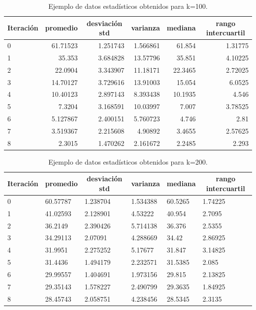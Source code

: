 \documentclass{article}
\begin{document}
\begin{table}[h!]
\centering
\caption{Ejemplo de datos estadísticos obtenidos para k=100.}
\label{tabla2}
\begin{tabular}{|l|r|r|r|r|r|}
\hline
\multicolumn{1}{|c|}{\textbf{Iteración}} & \multicolumn{1}{c|}{\textbf{promedio}} & \multicolumn{1}{c|}{\textbf{desviación std}} & \multicolumn{1}{c|}{\textbf{varianza}} & \multicolumn{1}{c|}{\textbf{mediana}} & \multicolumn{1}{c|}{\textbf{rango intercuartil}} \\ \hline
0 & 61.71523 & 1.251743 & 1.566861 & 61.854 & 1.31775 \\ \hline
1 & 35.353 & 3.684828 & 13.57796 & 35.851 & 4.10225 \\ \hline
2 & 22.0904 & 3.343907 & 11.18171 & 22.3465 & 2.72025 \\ \hline
3 & 14.70127 & 3.729616 & 13.91003 & 15.054 & 6.0525 \\ \hline
4 & 10.40123 & 2.897143 & 8.393438 & 10.1935 & 4.546 \\ \hline
5 & 7.3204 & 3.168591 & 10.03997 & 7.007 & 3.78525 \\ \hline
6 & 5.127867 & 2.400151 & 5.760723 & 4.746 & 2.81 \\ \hline
7 & 3.519367 & 2.215608 & 4.90892 & 3.4655 & 2.57625 \\ \hline
8 & 2.3015 & 1.470262 & 2.161672 & 2.2485 & 2.293 \\ \hline
\end{tabular}
\end{table}

\begin{table}[h!]
\centering
\caption{Ejemplo de datos estadísticos obtenidos para k=200.}
\label{tabla3}
\begin{tabular}{|l|l|l|l|l|l|}
\hline
\multicolumn{1}{|c|}{\textbf{Iteración}} & \multicolumn{1}{c|}{\textbf{promedio}} & \multicolumn{1}{c|}{\textbf{desviación std}} & \multicolumn{1}{c|}{\textbf{varianza}} & \multicolumn{1}{c|}{\textbf{mediana}} & \multicolumn{1}{c|}{\textbf{rango intercuartil}} \\ \hline
0 & 60.57787 & 1.238704 & 1.534388 & 60.5265 & 1.74225 \\ \hline
1 & 41.02593 & 2.128901 & 4.53222 & 40.954 & 2.7095 \\ \hline
2 & 36.2149 & 2.390426 & 5.714138 & 36.376 & 2.5355 \\ \hline
3 & 34.29113 & 2.07091 & 4.288669 & 34.42 & 2.86925 \\ \hline
4 & 31.9951 & 2.275252 & 5.17677 & 31.847 & 3.14825 \\ \hline
5 & 31.4436 & 1.494179 & 2.232571 & 31.5385 & 2.085 \\ \hline
6 & 29.99557 & 1.404691 & 1.973156 & 29.815 & 2.13825 \\ \hline
7 & 29.35143 & 1.578227 & 2.490799 & 29.3635 & 1.84925 \\ \hline
8 & 28.45743 & 2.058751 & 4.238456 & 28.5345 & 2.3135 \\ \hline
\end{tabular}
\end{table}
\end{document}

